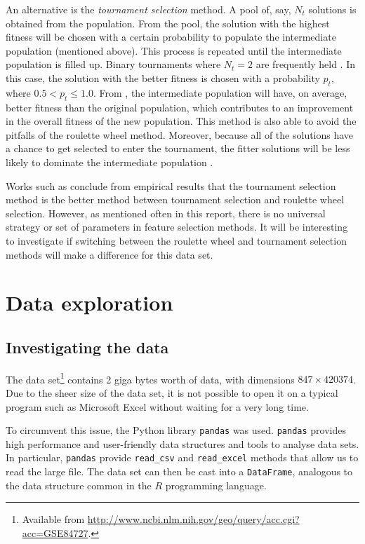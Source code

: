 \documentclass[12pt, twoside, a4paper]{report}
\begin{document}
An alternative is the \textit{tournament selection} method. A pool of, say, $N_t$ solutions is obtained from the population. From the pool, the solution with the highest fitness will be chosen with a certain probability to populate the intermediate population (mentioned above). This process is repeated until the intermediate population is filled up.  Binary tournaments where $N_t=2$ are frequently held \cite{RefWorks:242, RefWorks:243}. In this case, the solution with the better fitness is chosen with a probability $p_t$, where $0.5 < p_t \leq 1.0$. From \cite{RefWorks:242}, the intermediate population will have, on average, better fitness than the original population, which contributes to an improvement in the overall fitness of the new population. This method is also able to avoid the pitfalls of the roulette wheel method. Moreover, because all of the solutions have a chance to get selected to enter the tournament, the fitter solutions will be less likely to dominate the intermediate population \cite{RefWorks:245}.

Works such as \cite{RefWorks:245, RefWorks:246} conclude from empirical results that the tournament selection method is the better method between tournament selection and roulette wheel selection. However, as mentioned often in this report, there is no universal strategy or set of parameters in feature selection methods. It will be interesting to investigate if switching between the roulette wheel and tournament selection methods will make a difference for this data set.


\chapter{Data exploration}
\section{Investigating the data} \label{data:understanding}

The data set\footnote{Available from \url{http://www.ncbi.nlm.nih.gov/geo/query/acc.cgi?acc=GSE84727}.} contains 2 giga bytes worth of data, with dimensions $847 \times 420374$. Due to the sheer size of the data set, it is not possible to open it on a typical program such as Microsoft Excel without waiting for a very long time.

To circumvent this issue, the Python library \texttt{pandas} \cite{RefWorks:213} was used. \texttt{pandas} provides high performance and user-friendly data structures and tools to analyse data sets. In particular, \texttt{pandas} provide \texttt{read\_csv} and \texttt{read\_excel} methods that allow us to read the large file. The data set can then be cast into a \texttt{DataFrame}, analogous to the data structure common in the $R$ programming language.
\end{document}
